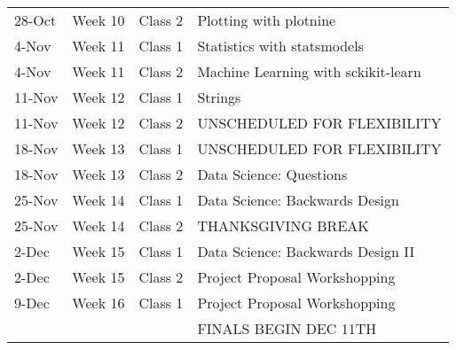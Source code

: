 \documentclass[12pt]{article}
\begin{document}
\begin{table}[]
\begin{tabular}{@{}llll@{}}
28-Oct             & Week 10 & Class 2 & Plotting with plotnine                   \\
4-Nov              & Week 11 & Class 1 & Statistics with statsmodels              \\
4-Nov              & Week 11 & Class 2 & Machine Learning with sckikit-learn      \\
11-Nov             & Week 12 & Class 1 & Strings                                  \\
11-Nov             & Week 12 & Class 2 & UNSCHEDULED FOR FLEXIBILITY              \\
18-Nov             & Week 13 & Class 1 & UNSCHEDULED FOR FLEXIBILITY              \\
18-Nov             & Week 13 & Class 2 & Data Science: Questions                  \\
25-Nov             & Week 14 & Class 1 & Data Science: Backwards Design           \\
25-Nov             & Week 14 & Class 2 & THANKSGIVING BREAK                       \\
2-Dec              & Week 15 & Class 1 & Data Science: Backwards Design II        \\
2-Dec              & Week 15 & Class 2 & Project Proposal Workshopping            \\
9-Dec              & Week 16 & Class 1 & Project Proposal Workshopping            \\
                   &         &         & FINALS BEGIN DEC 11TH                    \\ \bottomrule
\end{tabular}
\end{table}
\end{document}
